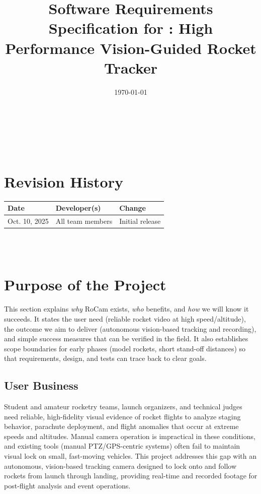 \documentclass[12pt]{article}
\begin{document}
\title{Software Requirements Specification for \progname: High Performance Vision-Guided Rocket Tracker}
\author{\authname}
\date{\today}

\maketitle

~\newpage

\tableofcontents

~\newpage

\section*{Revision History}

\begin{tabularx}{\textwidth}{llX}
  \toprule {\textbf{Date}} & {\textbf{Developer(s)}} & {\textbf{Change}} \\
  \midrule
  Oct. 10, 2025            & All team members        & Initial release   \\
  \bottomrule
\end{tabularx}

~\\

~\newpage
\section{Purpose of the Project}
This section explains \emph{why} RoCam exists, \emph{who} benefits, and
\emph{how} we will know it succeeds. It states the user need (reliable rocket
video at high speed/altitude), the outcome we aim to deliver (autonomous
vision-based tracking and recording), and simple success measures that can be
verified in the field. It also establishes scope boundaries for early phases
(model rockets, short stand-off distances) so that requirements, design, and
tests can trace back to clear goals.
\subsection{User Business}

Student and amateur rocketry teams, launch organizers, and technical judges
need reliable, high-fidelity visual evidence of rocket flights to analyze
staging behavior, parachute deployment, and flight anomalies that occur at
extreme speeds and altitudes. Manual camera operation is impractical in these
conditions, and existing tools (manual PTZ/GPS-centric systems) often fail to
maintain visual lock on small, fast-moving vehicles. This project addresses
this gap with an autonomous, vision-based tracking camera designed to lock onto
and follow rockets from launch through landing, providing real-time and
recorded footage for post-flight analysis and event operations.
\end{document}
